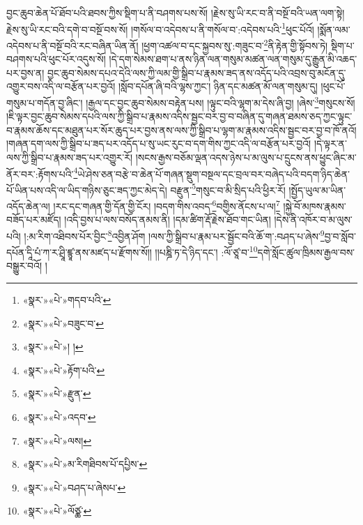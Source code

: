 བྱང་ཆུབ་ཆེན་པོ་ཐོབ་པའི་ཐབས་ཀྱིས་སྡིག་པ་ནི་བཤགས་པས་སོ། །རྗེས་སུ་ཡི་རང་བ་ནི་བསྔོ་བའི་ཡན་ལག་སྟེ། རྗེས་སུ་ཡི་རང་བའི་དགེ་བ་བསྔོ་བས་སོ། །གསོལ་བ་འདེབས་པ་ནི་གསོལ་བ་:འདེབས་པའི་\footnote{«སྣར་»«པེ་»གདབ་པའི་}ཕུང་པོའོ། །སྨོན་ལམ་འདེབས་པ་ནི་བསྔོ་བའི་རང་བཞིན་ཡིན་ནོ། །ཕྱག་འཚལ་བ་དང་སྐྱབས་སུ་:གཟུང་བ་\footnote{«སྣར་»«པེ་»བཟུང་བ་}ནི་རྟེན་གྱི་སྟོབས་ཏེ། སྡིག་པ་བཤགས་པའི་ཕུང་པོར་འདུས་སོ། །དེ་དག་སེམས་ཐག་པ་ནས་ཉིན་ལན་གསུམ་མཚན་ལན་གསུམ་དུ་རྒྱུན་མི་འཆད་པར་བྱས་ན། བྱང་ཆུབ་སེམས་དཔའ་དེའི་ལས་ཀྱི་ལམ་གྱི་སྒྲིབ་པ་རྣམས་ཟད་ནས་འདོད་པའི་འབྲས་བུ་མངོན་དུ་འགྱུར་བས་འདི་ལ་བརྩོན་པར་བྱའོ། །སློབ་དཔོན་ཞི་བའི་ལྷས་ཀྱང་། ཉིན་དང་མཚན་མོ་ལན་གསུམ་དུ། །ཕུང་པོ་གསུམ་པ་གདོན་བྱ་ཞིང་། །རྒྱལ་དང་བྱང་ཆུབ་སེམས་བརྟེན་པས། །ལྟུང་བའི་ལྷག་མ་དེས་ཞི་བྱ། །ཞེས་\footnote{«སྣར་»«པེ་»། །}གསུངས་སོ། །ཇི་ལྟར་བྱང་ཆུབ་སེམས་དཔའི་ལས་ཀྱི་སྒྲིབ་པ་རྣམས་འདིས་སྦྱང་བར་བྱ་བ་བཞིན་དུ་གཞན་ཐམས་ཅད་ཀྱང་ལྟུང་བ་རྣམས་ཆོས་དང་མཐུན་པར་སོར་ཆུད་པར་བྱས་ནས་ལས་ཀྱི་སྒྲིབ་པ་ལྷག་མ་རྣམས་འདིས་སྦྱང་བར་བྱ་བ་ཁོ་ནའོ། །གཞན་དག་ལས་ཀྱི་སྒྲིབ་པ་ཟད་པར་འདོད་པ་སུ་ཡང་རུང་བ་དག་གིས་ཀྱང་འདི་ལ་བརྩོན་པར་བྱའོ། །དེ་ལྟར་ན་ལས་ཀྱི་སྒྲིབ་པ་རྣམས་ཟད་པར་འགྱུར་རོ། །སངས་རྒྱས་བཅོམ་ལྡན་འདས་ཉེས་པ་མ་ལུས་པ་དྲུངས་ནས་ཕྱུང་ཞིང་མ་ནོར་བར་:རྟོགས་པའི་\footnote{«སྣར་»«པེ་»རྟོག་པའི་}ཡེ་ཤེས་ཅན་བརྩེ་བ་ཆེན་པོ་གཞན་སྡུག་བསྔལ་དང་བྲལ་བར་བཞེད་པའི་བདག་ཉིད་ཆེན་པོ་ཡིན་པས་འདི་ལ་ཡིད་གཉིས་ཅུང་ཟད་ཀྱང་མེད་དེ། བརྫུན་\footnote{«སྣར་»«པེ་»རྫུན་}གསུང་བ་མི་སྲིད་པའི་ཕྱིར་རོ། །སྤྱོད་ཡུལ་མ་ཡིན་འདོད་ཆེན་ལ། །རང་དང་གཞན་གྱི་དོན་གྱི་ངོར། །བདག་གིས་འབད་\footnote{«སྣར་»«པེ་»འདབ་}བགྱིས་ནོངས་པ་ལ།\footnote{«སྣར་»«པེ་»ལས།} །སྐྱེ་བོ་མཁས་རྣམས་བཟོད་པར་མཛོད། །འདི་བྱས་པ་ལས་བསོད་ནམས་ནི། །དམ་ཚིག་རྡོ་རྗེས་ཐོབ་གང་ཡིན། །དེས་ནི་འཁོར་བ་མ་ལུས་པའི། །:མ་རིག་འཐིབས་པོར་བྱིང་\footnote{«སྣར་»«པེ་»མ་རིགཐིབས་པོ་དཔྱིས་}འབྱིན་ཤོག །ལས་ཀྱི་སྒྲིབ་པ་རྣམ་པར་སྦྱོང་བའི་ཆོ་ག་:བཤད་པ་ཞེས་\footnote{«སྣར་»«པེ་»བཤད་པ་ཞེསཔ་}བྱ་བ་སློབ་དཔོན་དཱི་པཾ་ཀ་ར་ཤྲཱི་ཛྙཱ་ནས་མཛད་པ་རྫོགས་སོ།། །།པཎྜི་ཏ་དེ་ཉིད་དང་། :ལོ་ཙཱ་བ་\footnote{«སྣར་»«པེ་»ལོཙྪ་}དགེ་སློང་ཚུལ་ཁྲིམས་རྒྱལ་བས་བསྒྱུར་བའོ། ། 